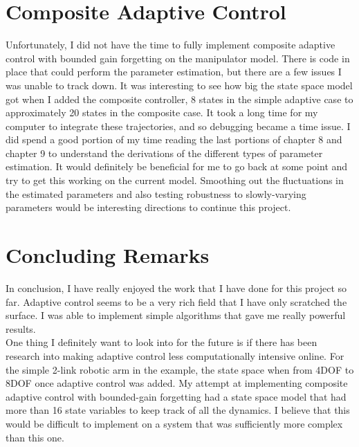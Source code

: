 \documentclass[12pt]{article}
\begin{document}
\section{Composite Adaptive Control}

Unfortunately, I did not have the time to fully implement composite adaptive control with bounded gain forgetting on the manipulator model. There is code in place that could perform the parameter estimation, but there are a few issues I was unable to track down. It was interesting to see how big the state space model got when I added the composite controller, 8 states in the simple adaptive case to approximately 20 states in the composite case. It took a long time for my computer to integrate these trajectories, and so debugging became a time issue. I did spend a good portion of my time reading the last portions of chapter 8 and chapter 9 to understand the derivations of the different types of parameter estimation. It would definitely be beneficial for me to go back at some point and try to get this working on the current model. Smoothing out the fluctuations in the estimated parameters and also testing robustness to slowly-varying parameters would be interesting directions to continue this project.
\\
\section{Concluding Remarks}

In conclusion, I have really enjoyed the work that I have done for this project so far. Adaptive control seems to be a very rich field that I have only scratched the surface. I was able to implement simple algorithms that gave me really powerful results.
\\

\noindent
One thing I definitely want to look into for the future is if there has been research into making adaptive control less computationally intensive online. For the simple 2-link robotic arm in the example, the state space when from 4DOF to 8DOF once adaptive control was added. My attempt at implementing composite adaptive control with bounded-gain forgetting had a state space model that had more than 16 state variables to keep track of all the dynamics. I believe that this would be difficult to implement on a system that was sufficiently more complex than this one.
\\
\end{document}
